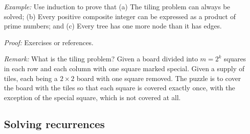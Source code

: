\documentclass{article}
\begin{document}
\begin{itemize}
{\em Example:} Use induction to prove that (a) The tiling 
problem can always be solved; (b) Every positive composite
integer can be expressed as a product of prime numbers; and
(c) Every tree has one more node than it has edges.

{\em Proof:} Exercises or references.

{\em Remark:} What is the tiling problem? Given a board divided
into $m=2^k$ squares in each row and each column with one square
marked special. Given a supply of tiles, each being a $2\times 2$
board with one square removed. The puzzle is to cover the board with
the tiles so that each square is covered exactly once, with the
exception of the special square, which is not covered at all. 

\end{itemize}

\subsection{Solving recurrences}

\end{document}
